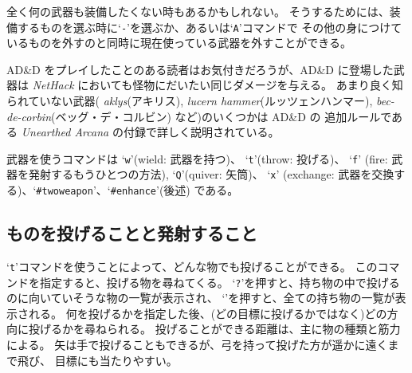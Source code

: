 全く何の武器も装備したくない時もあるかもしれない。
そうするためには、装備するものを選ぶ時に`{\tt -}'を選ぶか、あるいは`{\tt A}'コマンドで
その他の身につけているものを外すのと同時に現在使っている武器を外すことができる。

AD\&D をプレイしたことのある読者はお気付きだろうが、AD\&D に登場した武器は
{\it NetHack\/} においても怪物にだいたい同じダメージを与える。
あまり良く知られていない武器( %
{\it aklys}(アキリス), {\it lucern hammer}(ルッツェンハンマー),
{\it bec-de-corbin\/}(ベッグ・デ・コルビン) など)のいくつかは AD\&D の
追加ルールである {\it Unearthed Arcana} の付録で詳しく説明されている。

武器を使うコマンドは `{\tt w}'(wield: 武器を持つ)、 `{\tt t}'(throw: 投げる)、
`{\tt f}' (fire: 武器を発射するもうひとつの方法), `{\tt Q}'(quiver: 矢筒)、
`{\tt x}' (exchange: 武器を交換する)、`{\tt \#twoweapon}'、`{\tt \#enhance}'(後述) である。

\subsection*{ものを投げることと発射すること}

`{\tt t}'コマンドを使うことによって、どんな物でも投げることができる。
このコマンドを指定すると、投げる物を尋ねてくる。
`{\tt ?}'を押すと、持ち物の中で投げるのに向いていそうな物の一覧が表示され、
`{\tt *}'を押すと、全ての持ち物の一覧が表示される。
何を投げるかを指定した後、(どの目標に投げるかではなく)どの方向に投げるかを尋ねられる。
投げることができる距離は、主に物の種類と筋力による。
矢は手で投げることもできるが、弓を持って投げた方が遥かに遠くまで飛び、
目標にも当たりやすい。

